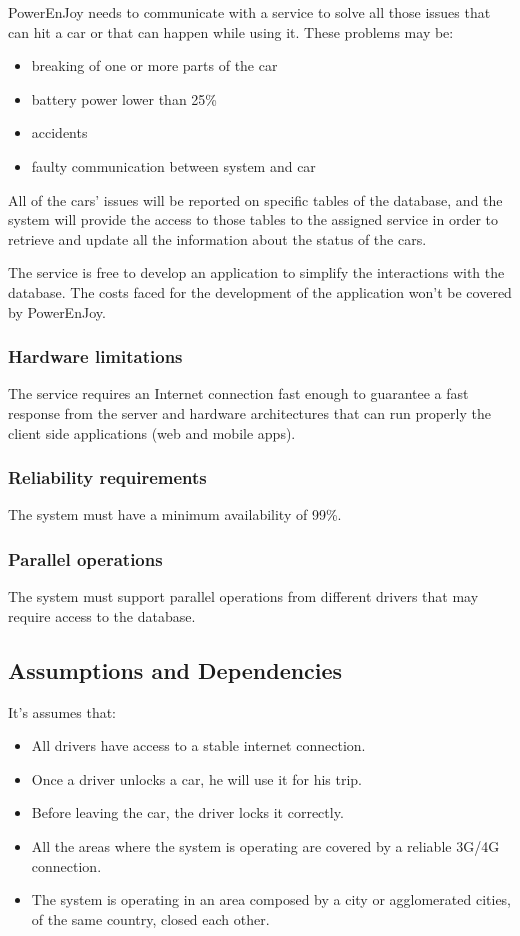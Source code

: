 PowerEnJoy needs to communicate with a service to solve all those issues that can hit a car or that can happen while using it. These problems may be:
\begin{itemize}
	\item breaking of one or more parts of the car
	\item battery power lower than 25\%
	\item accidents
	\item faulty communication between system and car
\end{itemize}
All of the cars' issues will be reported on specific tables of the database, and the system will provide the access to those tables to the assigned service in order to retrieve and update all the information about the status of the cars.

The service is free to develop an application to simplify the interactions with the database. The costs faced for the development of the application won't be covered by PowerEnJoy. 

\subsubsection{Hardware limitations}
The service requires an Internet connection fast enough to guarantee a fast response from the server and hardware architectures that can run properly the client side applications (web and mobile apps).

\subsubsection{Reliability requirements}
The system must have a minimum availability of 99\%.

\subsubsection{Parallel operations}
The system must support parallel operations from different drivers that may require access to the database.

\subsection{Assumptions and Dependencies}

It's assumes that:
\begin{itemize}
	\item All drivers have access to a stable internet connection.
	\item Once a driver unlocks a car, he will use it for his trip.
	\item Before leaving the car, the driver locks it correctly.
	\item All the areas where the system is operating are covered by a reliable 3G/4G connection.
	\item The system is operating in an area composed by a city or agglomerated cities, of the same country, closed each other.
\end{itemize}

